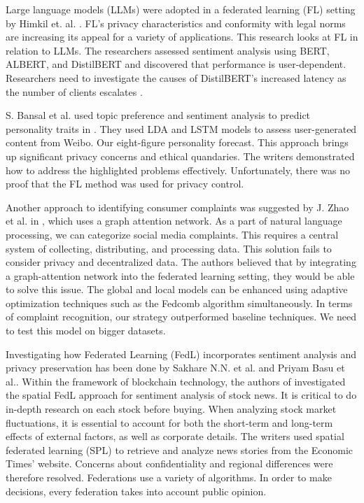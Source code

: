 Large language models (LLMs) were adopted in a federated learning (FL) setting by Himkil et. al. \cite{ref70}. FL's privacy characteristics and conformity with legal norms are increasing its appeal for a variety of applications. This research looks at FL in relation to LLMs. The researchers assessed sentiment analysis using BERT, ALBERT, and DistilBERT and discovered that performance is user-dependent. Researchers need to investigate the causes of DistilBERT's increased latency as the number of clients escalates \cite{ref71}.

S. Bansal et al. used topic preference and sentiment analysis to predict personality traits in \cite{ref72}. They used LDA and LSTM models to assess user-generated content from Weibo. Our eight-figure personality forecast. This approach brings up significant privacy concerns and ethical quandaries. The writers demonstrated how to address the highlighted problems effectively. Unfortunately, there was no proof that the FL method was used for privacy control.

Another approach to identifying consumer complaints was suggested by J. Zhao et al. in \cite{ref73}, which uses a graph attention network. As a part of natural language processing, we can categorize social media complaints. This requires a central system of collecting, distributing, and processing data. This solution fails to consider privacy and decentralized data. The authors believed that by integrating a graph-attention network into the federated learning setting, they would be able to solve this issue. The global and local models can be enhanced using adaptive optimization techniques such as the Fedcomb algorithm simultaneously. In terms of complaint recognition, our strategy outperformed baseline techniques. We need to test this model on bigger datasets.

Investigating how Federated Learning (FedL) incorporates sentiment analysis and privacy preservation has been done by Sakhare N.N. et al. \cite{ref74} and Priyam Basu et al.\cite{ref75}. Within the framework of blockchain technology, the authors of \cite{ref74} investigated the spatial FedL approach for sentiment analysis of stock news. It is critical to do in-depth research on each stock before buying. When analyzing stock market fluctuations, it is essential to account for both the short-term and long-term effects of external factors, as well as corporate details. The writers used spatial federated learning (SPL) to retrieve and analyze news stories from the Economic Times' website. Concerns about confidentiality and regional differences were therefore resolved. Federations use a variety of algorithms. In order to make decisions, every federation takes into account public opinion.

